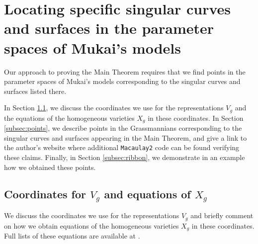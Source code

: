 \documentclass{amsart}[12pt]
\theoremstyle{definition}
\numberwithin{equation}{section}
\begin{document}
\section{Locating specific singular curves and surfaces in the parameter spaces of Mukai's models}
\label{sec: finding linear spaces}
Our approach to proving the Main Theorem requires that we find points in the parameter spaces of Mukai's models corresponding to the singular curves and surfaces listed there.

In Section \ref{subsec:VgXg}, we discuss the coordinates we use for the representations $V_g$ and the equations of the homogeneous varieties $X_g$ in these coordinates. In Section \ref{subsec:points}, we describe points in the Grassmannians corresponding to the singular curves and surfaces appearing in the Main Theorem, and give a link to the author's website where additional \texttt{Macaulay2} code can be found verifying these claims.  Finally, in Section \ref{subsec:ribbon}, we demonstrate in an example how we obtained these points.


\subsection{Coordinates for $V_g$ and equations of $X_g$}\label{subsec:VgXg}

We discuss the coordinates we use for the representations $V_g$ and
briefly comment on how we obtain  equations of the homogeneous
varieties $X_g$ in these coordinates. Full lists of 
these equations are available at \cite{Code}.  %
\end{document}
